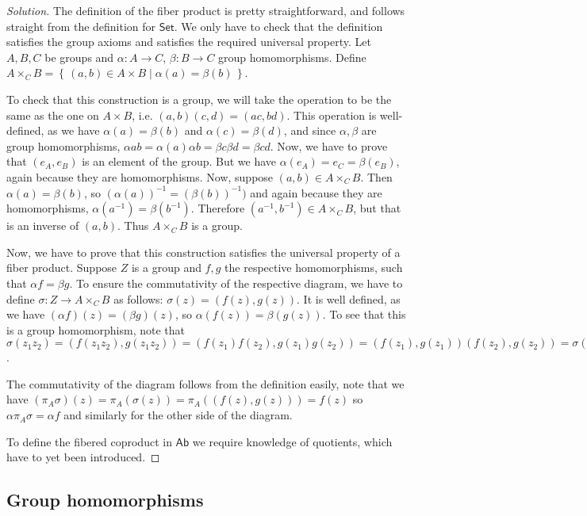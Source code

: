 \documentclass{article}
\theoremstyle{definition}
\newenvironment{solution}{
	\begin{proof}[Solution]
		\vspace{-8px}
		\setlength{\parskip}{4px}
		\setlength{\parindent}{0px}
	}{
\end{proof}
}
\newcommand{\set}[1]{\left\{\,#1\,\right\}}
\begin{document}
\begin{solution}
	The definition of the fiber product is pretty straightforward, and follows straight from the definition for $\mathsf{Set}$. We only have to check that the definition satisfies the group axioms and satisfies the required universal property. Let $A,B,C$ be groups and $\alpha: A \to C$, $\beta: B \to C$ group homomorphisms. Define $A \times_C B = \set{(a,b) \in A \times B \mid \alpha(a)=\beta(b)}$.
	
	To check that this construction is a group, we will take the operation to be the same as the one on $A \times B$, i.e. $(a,b)(c,d)=(ac,bd)$. This operation is well-defined, as we have $\alpha(a)=\beta(b)$ and $\alpha(c)=\beta(d)$, and since $\alpha, \beta$ are group homomorphisms, $\alpha{ab}=\alpha(a)\alpha{b}=\beta{c}\beta{d}=\beta{cd}$. Now, we have to prove that $(e_A, e_B)$ is an element of the group. But we have $\alpha(e_A)=e_C=\beta(e_B)$, again because they are homomorphisms. Now, suppose $(a,b) \in A \times_C B$. Then $\alpha(a)=\beta(b)$, so $(\alpha(a))^{-1}=(\beta(b))^{-1})$ and again because they are homomorphisms, $\alpha(a^{-1})=\beta(b^{-1})$. Therefore $(a^{-1}, b^{-1}) \in A \times_C B$, but that is an inverse of $(a, b)$. Thus $A \times_C B$ is a group.
	
	Now, we have to prove that this construction satisfies the universal property of a fiber product. Suppose $Z$ is a group and $f, g$ the respective homomorphisms, such that $\alpha f = \beta g$. To ensure the commutativity of the respective diagram, we have to define $\sigma: Z \to A \times_C B$ as follows: $\sigma(z)=(f(z),g(z))$.  It is well defined, as we have $(\alpha f)(z) = (\beta g)(z)$, so $\alpha (f(z))=\beta(g(z))$. To see that this is a group homomorphism, note that $\sigma(z_1 z_2) = (f(z_1z_2), g(z_1z_2)) = (f(z_1)f(z_2),g(z_1)g(z_2))=(f(z_1), g(z_1))(f(z_2), g(z_2))=\sigma(z_1)\sigma(z_2)$.

	The commutativity of the diagram follows from the definition easily, note that we have $(\pi_A \sigma)(z)=\pi_A(\sigma(z))=\pi_A((f(z), g(z)))=f(z)$ so $\alpha \pi_A \sigma = \alpha f$ and similarly for the other side of the diagram.
	
	To define the fibered coproduct in $\mathsf{Ab}$ we require knowledge of quotients, which have to yet been introduced.
\end{solution}

\subsection{Group homomorphisms}
\end{document}
